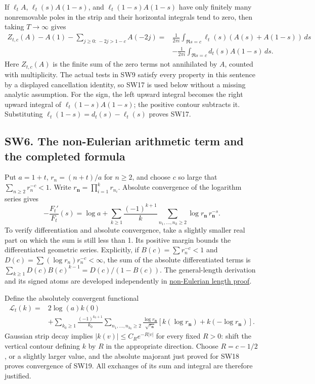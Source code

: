 \documentclass[
  10pt,
  a4paper,
]{article}
\begin{document}
If \(\ell_t A\), \(\ell_t(s)A(1-s)\), and \(\ell_t(1-s)A(1-s)\) have
only finitely many nonremovable poles in the strip and their horizontal
integrals tend to zero, then taking \(T\to\infty\) gives \[
\begin{split}
Z_{t,c}(A)-A(1)-\sum_{j\ge0:\,-2j>1-c}A(-2j)
={}&\frac1{2\pi i}\int_{\Re s=c}
\ell_t(s)(A(s)+A(1-s))\,ds\\
&-\frac1{2\pi i}\int_{\Re s=c}d_t(s)A(1-s)\,ds.
\end{split}
\tag{SW17}
\] Here \(Z_{t,c}(A)\) is the finite sum of the zero terms not
annihilated by \(A\), counted with multiplicity. The actual tests in SW9
satisfy every property in this sentence by a displayed cancellation
identity, so SW17 is used below without a missing analytic assumption.
For the sign, the left upward integral becomes the right upward integral
of \(\ell_t(1-s)A(1-s)\); the positive contour subtracts it.
Substituting \(\ell_t(1-s)=d_t(s)-\ell_t(s)\) proves SW17.

\subsection{SW6. The non-Eulerian arithmetic term and the completed
formula}\label{sw6.-the-non-eulerian-arithmetic-term-and-the-completed-formula}

Put \(a=1+t\), \(r_n=(n+t)/a\) for \(n\ge2\), and choose \(c\) so large
that \(\sum_{n\ge2}r_n^{-c}<1\). Write
\(r_{\boldsymbol n}=\prod_{i=1}^k r_{n_i}\). Absolute convergence of the
logarithm series gives \[
-\frac{F_t'}{F_t}(s)=\log a+
\sum_{k\ge1}\frac{(-1)^{k+1}}k
\sum_{n_1,\ldots,n_k\ge2}
\log r_{\boldsymbol n}\,r_{\boldsymbol n}^{-s}.
\tag{SW18}
\] To verify differentiation and absolute convergence, take a slightly
smaller real part on which the sum is still less than 1. Its positive
margin bounds the differentiated geometric series. Explicitly, if
\(B(c)=\sum r_n^{-c}<1\) and \(D(c)=\sum(\log r_n)r_n^{-c}<\infty\), the
sum of the absolute differentiated terms is
\(\sum_{k\ge1}D(c)B(c)^{k-1}=D(c)/(1-B(c))\). The general-length
derivation and its signed atoms are developed independently in
\href{https://github.com/KokunoYumeto/zeta-function-research-reader/blob/173dbc6ed5a03235dbe7654f928f3692107db39b/workbenches/splitzero-tandem/branches/tau-zero-prime-positivity/NON_EULERIAN_LENGTH_DERIVATION.md}{non-Eulerian
length proof}.

Define the absolutely convergent functional \[
\begin{split}
\mathcal L_t(k)={}&2\log(a)k(0)\\
&+\sum_{k_0\ge1}\frac{(-1)^{k_0+1}}{k_0}
\sum_{n_1,\ldots,n_{k_0}\ge2}
\frac{\log r_{\boldsymbol n}}{\sqrt{r_{\boldsymbol n}}}
\left[k(\log r_{\boldsymbol n})+k(-\log r_{\boldsymbol n})\right].
\end{split}
\tag{SW19}
\] Gaussian strip decay implies \(|k(v)|\le C_R e^{-R|v|}\) for every
fixed \(R>0\): shift the vertical contour defining \(k\) by \(R\) in the
appropriate direction. Choose \(R=c-1/2\), or a slightly larger value,
and the absolute majorant just proved for SW18 proves convergence of
SW19. All exchanges of its sum and integral are therefore justified.
\end{document}
